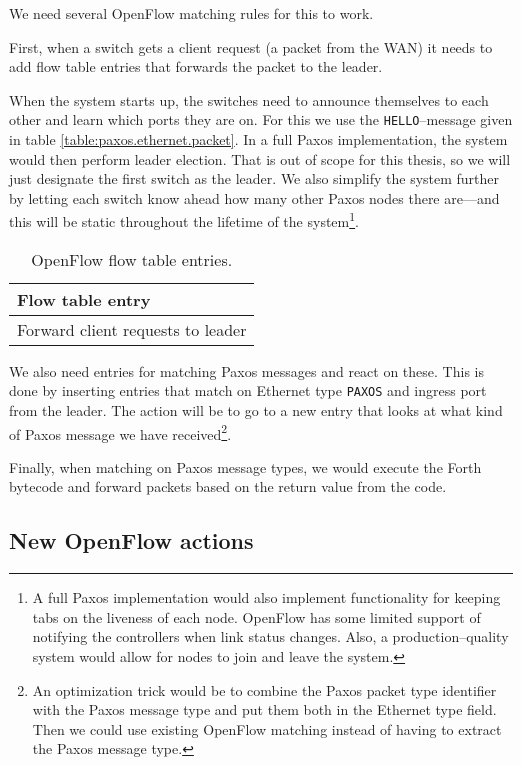 We need several OpenFlow matching rules for this to work.

First, when a switch gets a client request (a packet from the WAN) it needs
to add flow table entries that forwards the packet to the leader.

When the system starts up, the switches need to announce themselves to each
other and learn which ports they are on.  For this we use the
\texttt{HELLO}--message given in table \ref{table:paxos.ethernet.packet}.
In a full Paxos implementation, the system would then perform leader
election.  That is out of scope for this thesis, so we will just designate
the first switch as the leader.  We also simplify the system further by
letting each switch know ahead how many other Paxos nodes there are---and
this will be static throughout the lifetime of the system\footnote{A full
Paxos implementation would also implement functionality for keeping tabs
on the liveness of each node.  OpenFlow has some limited support of
notifying the controllers when link status changes.  Also, a
production--quality system would allow for nodes to join and leave the
system.}.

\begin{table}[H]
  \centering
  \begin{tabular}{|l|}
    \hline \textbf{Flow table entry} \\
    \hline Forward client requests to leader \\
    \hline
  \end{tabular}

  \caption{OpenFlow flow table entries.}
  \label{table:paxos.flowtable.entries}
\end{table}

We also need entries for matching Paxos messages and react on these.
This is done by inserting entries that match on Ethernet type
\texttt{PAXOS} and ingress port from the leader.
The action will be to go to a new entry that looks at what kind of Paxos
message we have received\footnote{An optimization trick would be to
combine the Paxos packet type identifier with the Paxos message type and put
them both in the Ethernet type field.  Then we could use existing OpenFlow
matching instead of having to extract the Paxos message type.}.

Finally, when matching on Paxos message types, we would execute the Forth
bytecode and forward packets based on the return value from the code.

\subsection{New OpenFlow actions}

